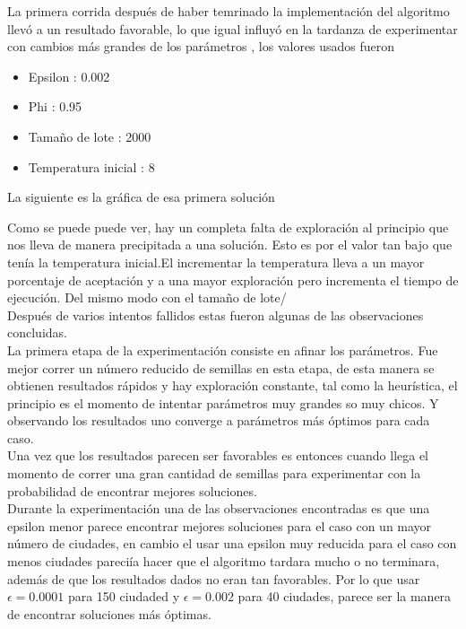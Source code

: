 \documentclass[a4paper]{article}
\begin{document}
La primera corrida despu\'es de haber temrinado la implementaci\'on del algoritmo llev\'o a un resultado favorable, lo que igual influy\'o en la tardanza de experimentar con cambios m\'as grandes de los par\'ametros , los valores usados fueron
\begin{itemize}
\item Epsilon : 0.002
\item Phi : 0.95
\item Tamaño de lote : 2000
\item Temperatura inicial : 8
\end{itemize}
La siguiente es la gr\'afica de esa primera soluci\'on



Como se puede puede ver, hay un completa falta de exploraci\'on al principio que nos lleva de manera precipitada a una soluci\'on. Esto es por el valor tan bajo que ten\'ia la temperatura inicial.El incrementar la temperatura lleva a un mayor porcentaje de aceptaci\'on y a una mayor exploraci\'on pero incrementa el tiempo de ejecuci\'on. Del mismo modo con el tamaño de lote/\\

Despu\'es de varios intentos fallidos estas fueron algunas de las observaciones concluidas.\\

La primera etapa de la experimentaci\'on consiste en afinar los par\'ametros. Fue mejor correr un n\'umero reducido de semillas en esta etapa, de esta manera se obtienen resultados r\'apidos y hay exploraci\'on constante, tal como la heur\'istica, el principio es el momento de intentar par\'ametros muy grandes so muy chicos. Y observando los resultados uno converge a par\'ametros m\'as \'optimos para cada caso. \\


Una vez que los resultados parecen ser favorables es entonces cuando llega el momento de correr una gran cantidad de semillas para experimentar con la probabilidad de encontrar mejores soluciones. \\

Durante la experimentaci\'on una de las observaciones encontradas es que una epsilon menor parece encontrar mejores soluciones para el caso con un mayor n\'umero de ciudades, en cambio el usar una epsilon muy reducida para el caso con menos ciudades pareci\'ia hacer que el algoritmo tardara mucho o no terminara, adem\'as de que los resultados dados no eran tan favorables. Por lo que usar $\epsilon = 0.0001$ para 150 ciudaded y $\epsilon = 0.002$ para 40 ciudades, parece ser la manera de encontrar soluciones m\'as \'optimas. \\
\end{document}
